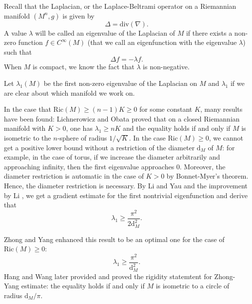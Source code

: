 \documentclass[11pt]{amsart}
\def\d{\mathrm{d}}
\def\div{\mathrm{div}}
\def\ric{\mathrm{Ric}}
\begin{document}
Recall that the Laplacian, or the Laplace-Beltrami operator on a Riemannian manifold $(M^n,g)$ is given by
$$\Delta=\div(\nabla).$$
A value $\lambda$ will be called an eigenvalue of the Laplacian of $M$ if there exists a non-zero function $f\in C^\infty(M)$ (that we call an  eigenfunction with the eigenvalue $\lambda$) such that 
$$\Delta f=-\lambda f.$$
When $M$ is compact, we know the fact that $\lambda$ is non-negative.

Let $\lambda_1(M)$ be the first non-zero eigenvalue of the Laplacian on $M$ and $\lambda_1$ if we are clear about which manifold we work on.




In the case that $\ric(M)\geq (n-1)K\geq 0$ for some constant $K$, many results have been found: Lichnerowicz \cite{lich} and Obata \cite{obata} proved that on a closed Riemannian manifold with $K>0$, one has $\lambda_1\geq nK$ and the equality holds if and only if $M$ is isometric to the $n$-sphere of radius $1/\sqrt{K}$. In the case $\ric(M)\geq 0$, we cannot get a positive lower bound without a restriction of the diameter $\d_M$ of $M$: for example, in the case of torus, if we increase the diameter arbitrarily and approaching infinity, then the first eigenvalue approaches $0$. Moreover, the diameter restriction is automatic in the case of $K>0$ by Bonnet-Myer's theorem. Hence, the diameter restriction is necessary. By Li and Yau \cite{liyau} and the improvement by Li \cite{li}, we get a gradient estimate for the first nontrivial eigenfunction and derive that
$$\lambda_1\geq\frac{\pi^2}{2\d_M^2}.$$

Zhong and Yang \cite{zhongyang} enhanced this result to be an optimal one for the case of $\ric(M)\geq 0$:
$$\lambda_1\geq \frac{\pi^2}{\d_M^2}.$$
Hang and Wang \cite{hangwang} later provided and proved the rigidity statemtent for Zhong-Yang estimate: the equality holds if and only if $M$ is isometric to a circle of radius $\d_M/\pi$. 
\end{document}
